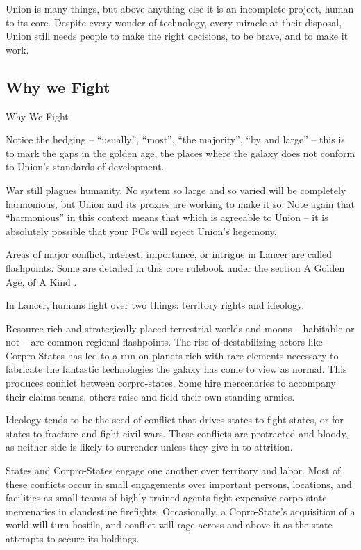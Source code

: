 Union is many things, but above anything else it is an incomplete project, human to its core.  
Despite every wonder of technology, every miracle at their disposal, Union still needs people to  
make the right decisions, to be brave, and to make it work. 
 
\subsection{Why we Fight}
Why We Fight  

Notice the hedging -- “usually”, “most”, “the majority”, “by and large” -- this is to mark the gaps  
in the golden age, the places where the galaxy does not conform to Union’s standards of  
development.
 

                                                                                                           


War still plagues humanity. No system so large and so varied will be completely harmonious, but  
Union and its proxies are working to make it so. Note again that “harmonious” in this context  
means that which is agreeable to Union -- it is absolutely possible that your PCs will reject  
Union’s hegemony.  
 

Areas of major conflict, interest, importance, or intrigue in Lancer are called flashpoints. Some  
are detailed in this core rulebook under the section A Golden Age, of A Kind . 
 

In Lancer, humans fight over two things: territory rights and ideology. 
 

Resource-rich and strategically placed terrestrial worlds and moons -- habitable or not -- are  
common regional flashpoints. The rise of destabilizing actors like Corpro-States has led to a run  
on planets rich with rare elements necessary to fabricate the fantastic technologies the galaxy  
has come to view as normal. This produces conflict between corpro-states. Some hire  
mercenaries to accompany their claims teams, others raise and field their own standing armies. 
 

Ideology tends to be the seed of conflict that drives states to fight states, or for states to fracture  
and fight civil wars. These conflicts are protracted and bloody, as neither side is likely to  
surrender unless they give in to attrition. 
 

States and Corpro-States engage one another over territory and labor. Most of these conflicts  
occur in small engagements over important persons, locations, and facilities as small teams of  
highly trained agents fight expensive corpo-state mercenaries in clandestine firefights.  
Occasionally, a Copro-State’s acquisition of a world will turn hostile, and conflict will rage across  
and above it as the state attempts to secure its holdings. 
 
